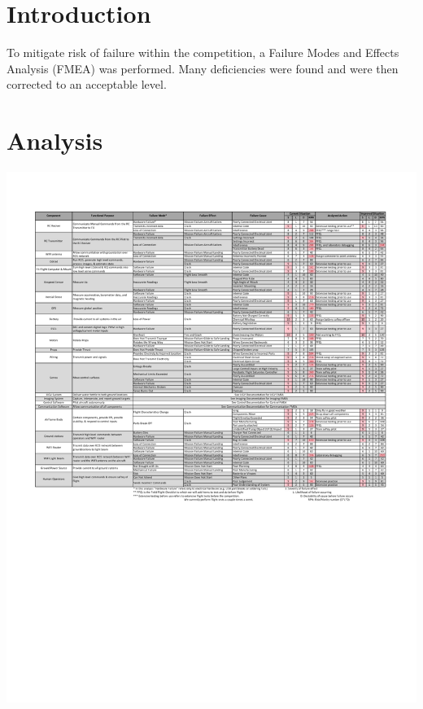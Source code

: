 \documentclass[]{auvsi_doc}
\begin{document}
\begin{AUVSITitlePage}
\begin{artifacttable}
\end{artifacttable}
\end{AUVSITitlePage}
\vspace*{-2cm}
\section{Introduction}
\vspace*{-0.5cm}
To mitigate risk of failure within the competition, a Failure Modes and Effects Analysis (FMEA) was performed. Many deficiencies were found and were then corrected to an acceptable level.
\vspace*{-0.5cm}
\section{Analysis}
\vspace*{-0.5cm}
\hspace*{-1.54cm}
\includegraphics[width=1.2\textwidth]{./figs/FMEA.pdf}
\label{fig:reqMat}
\end{document}
